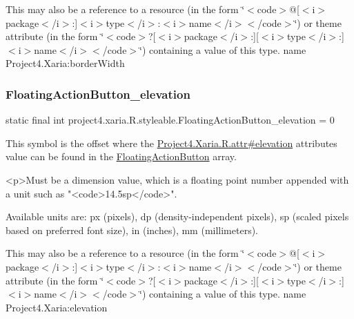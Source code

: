 This may also be a reference to a resource (in the form \char`\"{}$<$code$>$@\mbox{[}$<$i$>$package$<$/i$>$\+:\mbox{]}$<$i$>$type$<$/i$>$\+:$<$i$>$name$<$/i$>$$<$/code$>$\char`\"{}) or theme attribute (in the form \char`\"{}$<$code$>$?\mbox{[}$<$i$>$package$<$/i$>$\+:\mbox{]}\mbox{[}$<$i$>$type$<$/i$>$\+:\mbox{]}$<$i$>$name$<$/i$>$$<$/code$>$\char`\"{}) containing a value of this type.  name Project4.\+Xaria\+:border\+Width \mbox{\label{classproject4_1_1xaria_1_1R_1_1styleable_a1f212346344f0518ba9f7671202beaf7}} 
\subsubsection{\texorpdfstring{Floating\+Action\+Button\+\_\+elevation}{FloatingActionButton\_elevation}}
{\footnotesize\ttfamily static final int project4.\+xaria.\+R.\+styleable.\+Floating\+Action\+Button\+\_\+elevation = 0\hspace{0.3cm}{\ttfamily [static]}}

This symbol is the offset where the \hyperlink{}{Project4.\+Xaria.\+R.\+attr\#elevation} attribute\textquotesingle{}s value can be found in the \hyperlink{classproject4_1_1xaria_1_1R_1_1styleable_afccbd80ac1ce5fd6f7a9ee0a1b546322}{Floating\+Action\+Button} array.

\begin{DoxyVerb}      <p>Must be a dimension value, which is a floating point number appended with a unit such as "<code>14.5sp</code>".
\end{DoxyVerb}
 Available units are\+: px (pixels), dp (density-\/independent pixels), sp (scaled pixels based on preferred font size), in (inches), mm (millimeters). 

This may also be a reference to a resource (in the form \char`\"{}$<$code$>$@\mbox{[}$<$i$>$package$<$/i$>$\+:\mbox{]}$<$i$>$type$<$/i$>$\+:$<$i$>$name$<$/i$>$$<$/code$>$\char`\"{}) or theme attribute (in the form \char`\"{}$<$code$>$?\mbox{[}$<$i$>$package$<$/i$>$\+:\mbox{]}\mbox{[}$<$i$>$type$<$/i$>$\+:\mbox{]}$<$i$>$name$<$/i$>$$<$/code$>$\char`\"{}) containing a value of this type.  name Project4.\+Xaria\+:elevation \mbox{\label{classproject4_1_1xaria_1_1R_1_1styleable_a7a8737e325d68750ce13b2e494dd1c65}} 
